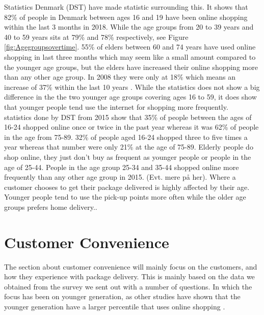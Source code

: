 \documentclass[12pt]{report}
\begin{document}
Statistics Denmark (DST) have made statistic surrounding this.
 It shows that 82\% of people in Denmark between ages 16 and 19 have been online shopping within the last 3 months in 2018. While the age groups from 20 to 39 years and 40 to 59 years sits at 79\% and 78\% respectively, see Figure \ref{fig:Agegroupsovertime}. 55\% of elders between 60 and 74 years have used online shopping in last three months which may seem like a small amount compared to the younger age groups, but the elders have increased their online shopping more than any other age group. In 2008 they were only at 18\% which means an increase of 37\% within the last 10 years \cite{danmarkstat1}.
While the statistics does not show a big difference in the the two younger age groups covering ages 16 to 59, it does show that younger people tend use the internet for shopping more frequently. \\
statistics done by DST from 2015\cite{DST} show that 35\% of people between the ages of 16-24 shopped online once or twice in the past year whereas it was 62\% of people in the age from 75-89. 32\% of people aged 16-24 shopped three to five times a year whereas that number were only 21\% at the age of 75-89. Elderly people do shop online, they just don't buy as frequent as younger people or people in the age of 25-44. People in the age group 25-34 and 35-44 shopped online more frequently than any other age group in 2015. (Evt. mere på her).
Where a customer chooses to get their package delivered is highly affected by their age. Younger people tend to use the pick-up points more often while the older age groups prefers home delivery.\cite{FDIHyearreport}. \\%



\section{Customer Convenience}
The section about customer convenience will mainly focus on the customers, and how they experience with package delivery. This is mainly based on the data we obtained from the survey we sent out with a number of questions. In which the focus has been on younger generation, as other studies have shown that the younger generation have a larger percentile that uses online shopping \cite{danmarkstat2}. \\
\end{document}
